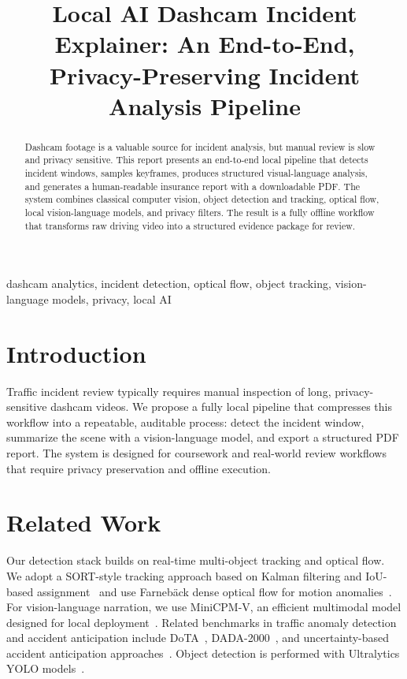 \documentclass[conference]{IEEEtran}
\title{Local AI Dashcam Incident Explainer: An End-to-End, Privacy-Preserving Incident Analysis Pipeline}
\author{
    \IEEEauthorblockN{Kunal Tailor}
    \IEEEauthorblockA{Computer Vision Course Project\\
    \textit{Local AI Dashcam Incident Explainer}\\
    March 2026}
}
\begin{document}
\maketitle

\begin{abstract}
Dashcam footage is a valuable source for incident analysis, but manual review is slow and privacy sensitive. This report presents an end-to-end local pipeline that detects incident windows, samples keyframes, produces structured visual-language analysis, and generates a human-readable insurance report with a downloadable PDF. The system combines classical computer vision, object detection and tracking, optical flow, local vision-language models, and privacy filters. The result is a fully offline workflow that transforms raw driving video into a structured evidence package for review.
\end{abstract}

\begin{IEEEkeywords}
dashcam analytics, incident detection, optical flow, object tracking, vision-language models, privacy, local AI
\end{IEEEkeywords}

\section{Introduction}
Traffic incident review typically requires manual inspection of long, privacy-sensitive dashcam videos. We propose a fully local pipeline that compresses this workflow into a repeatable, auditable process: detect the incident window, summarize the scene with a vision-language model, and export a structured PDF report. The system is designed for coursework and real-world review workflows that require privacy preservation and offline execution.

\section{Related Work}
Our detection stack builds on real-time multi-object tracking and optical flow. We adopt a SORT-style tracking approach based on Kalman filtering and IoU-based assignment~\cite{bewley2016sort} and use Farneb\"ack dense optical flow for motion anomalies~\cite{farneback2003flow}. For vision-language narration, we use MiniCPM-V, an efficient multimodal model designed for local deployment~\cite{minicpmv2024}. Related benchmarks in traffic anomaly detection and accident anticipation include DoTA~\cite{dota2023}, DADA-2000~\cite{dada2019}, and uncertainty-based accident anticipation approaches~\cite{uncertainty2020}. Object detection is performed with Ultralytics YOLO models~\cite{ultralytics}.
\end{document}
